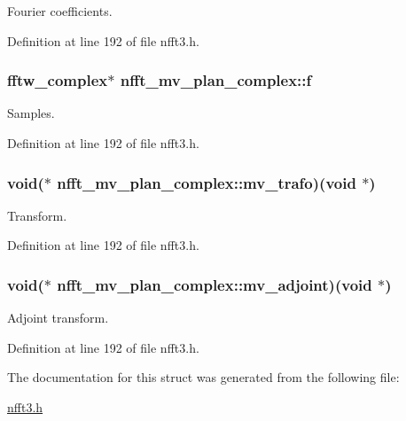 Fourier coefficients. 



Definition at line 192 of file nfft3.\-h.

\hypertarget{structnfft__mv__plan__complex_a84fdb468f61a2f2a135d41ae0da1692e}{
\subsubsection[{f}]{\setlength{\rightskip}{0pt plus 5cm}fftw\-\_\-complex$\ast$ nfft\-\_\-mv\-\_\-plan\-\_\-complex\-::f}}\label{structnfft__mv__plan__complex_a84fdb468f61a2f2a135d41ae0da1692e}


Samples. 



Definition at line 192 of file nfft3.\-h.

\hypertarget{structnfft__mv__plan__complex_a56bf298c03c4aaeb6b4aaf7ed5cca57e}{
\subsubsection[{mv\-\_\-trafo}]{\setlength{\rightskip}{0pt plus 5cm}void($\ast$ nfft\-\_\-mv\-\_\-plan\-\_\-complex\-::mv\-\_\-trafo)(void $\ast$)}}\label{structnfft__mv__plan__complex_a56bf298c03c4aaeb6b4aaf7ed5cca57e}


Transform. 



Definition at line 192 of file nfft3.\-h.

\hypertarget{structnfft__mv__plan__complex_add14030aae4920f7ca71ecf1efde00a3}{
\subsubsection[{mv\-\_\-adjoint}]{\setlength{\rightskip}{0pt plus 5cm}void($\ast$ nfft\-\_\-mv\-\_\-plan\-\_\-complex\-::mv\-\_\-adjoint)(void $\ast$)}}\label{structnfft__mv__plan__complex_add14030aae4920f7ca71ecf1efde00a3}


Adjoint transform. 



Definition at line 192 of file nfft3.\-h.



The documentation for this struct was generated from the following file\-:\begin{DoxyCompactItemize}
\item 
\hyperlink{nfft3_8h}{nfft3.\-h}\end{DoxyCompactItemize}

